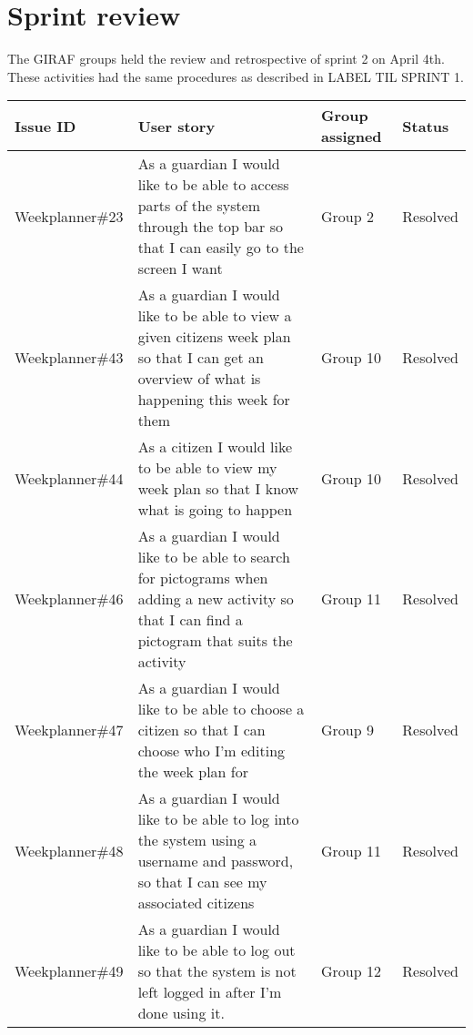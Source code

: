 \section{Sprint review}
The GIRAF groups held the review and retrospective of sprint 2 on April 4th.
These activities had the same procedures as described in LABEL TIL SPRINT 1.
\begin{table}[!ht]
    \small
    \begin{tabular}{|p{2.8cm}|p{7cm}|p{1.5cm}|p{1.4cm}|}
    \hline
    Issue ID        & User story                                                                                                                                                                               & Group assigned  & Status     \\ \hline
    Weekplanner\#23 & As a guardian I would like to be able to access parts of the system through the top bar so that I can easily go to the screen I want                                                     & Group 2         & Resolved      \\ \hline
    Weekplanner\#43 & As a guardian I would like to be able to view a given citizens week plan so that I can get an overview of what is happening this week for them                                           & Group 10        & Resolved      \\ \hline
    Weekplanner\#44 & As a citizen I would like to be able to view my week plan so that I know what is going to happen                                                                                         & Group 10        & Resolved     \\ \hline
    Weekplanner\#46 & As a guardian I would like to be able to search for pictograms when adding a new activity so that I can find a pictogram that suits the activity                                         & Group 11        & Resolved   \\ \hline
    Weekplanner\#47 & As a guardian I would like to be able to choose a citizen so that I can choose who I’m editing the week plan for                                                                         & Group 9         & Resolved   \\ \hline
    Weekplanner\#48 & As a guardian I would like to be able to log into the system using a username and password, so that I can see my associated citizens                                                     & Group 11        & Resolved  \\ \hline
    Weekplanner\#49 & As a guardian I would like to be able to log out so that the system is not left logged in after I’m done using it.                                                                       & Group 12        & Resolved     \\ \hline

\end{tabular}
\end{table}
